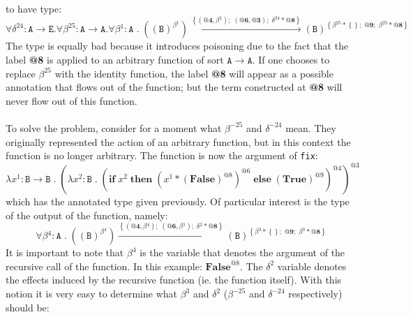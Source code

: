 \documentclass[8pt]{extarticle}
\begin{document}
to have type:
\[
\forall{}\delta^{24}:\mathtt{A}\to\mathtt{E}.\forall{}\beta^{25}:\mathtt{A}\to\mathtt{A}.\forall{}\beta{}^{1}:\mathtt{A}\;{}.\;{}\left(\left(\mathtt{B}\right)^{\beta{}^{1}}\right)\xrightarrow{\left\{\left(\textbf{@4},\beta{}^{1}\right);\;{}\left(\textbf{@6},\textbf{@3}\right);\;{}\delta{}^{24}*\textbf{@8}\right\}}\left(\mathtt{B}\right)^{\left\{\beta{}^{25}*\left\{\right\};\;{}\textbf{@9};\;{}\beta{}^{25}*\textbf{@8}\right\}}
\]
The type is equally bad because it introduces poisoning due to the fact that the label {\bf @8} is applied to an arbitrary function of sort $\mathtt{A}\to\mathtt{A}$. If one chooses to replace $\beta^{25}$ with the identity function, the label {\bf @8} will appear as a possible annotation that flows out of the function; but the term constructed at {\bf @8} will never flow out of this function.
\\\\
To solve the problem, consider for a moment what $\beta^{-25}$ and $\delta^{-24}$ mean. They originally represented the action of an arbitrary function, but in this context the function is no longer arbitrary. The function is now the argument of \verb+fix+:
\[
\lambda{}x^{1}:\mathtt{B}\to{}\mathtt{B}\;{}.\;{}\left(\lambda{}x^{2}:\mathtt{B}\;{}.\;{}\left(\mathbf{if}\;{}x^{2}\;{}\mathbf{then}\;{}\left(x^{1}*\left(\mathbf{False}\right)^{\mathit{@8}}\right)^{\mathit{@6}}\;{}\mathbf{else}\;{}\left(\mathbf{True}\right)^{\mathit{@9}}\right)^{\mathit{@4}}\right)^{\mathit{@3}}
\]
which has the annotated type given previously. Of particular interest is the type of the output of the function, namely:
\[
\forall{}\beta{}^{4}:\mathtt{A}\;{}.\;{}\left(\left(\mathtt{B}\right)^{\beta{}^{4}}\right)\xrightarrow{\left\{\left(\textbf{@4},\beta{}^{4}\right);\;{}\left(\textbf{@6},\beta{}^{1}\right);\;{}\delta{}^{2}*\textbf{@8}\right\}}\left(\mathtt{B}\right)^{\left\{\beta{}^{3}*\left\{\right\};\;{}\textbf{@9};\;{}\beta{}^{3}*\textbf{@8}\right\}}
\]
It is important to note that $\beta^{4}$ is the variable that denotes the argument of the recursive call of the function. In this example: $\mathbf{False}^{\mathit{@8}}$. The $\delta^2$ variable denotes the effects induced by the recursive function (ie. the function itself). With this notion it is very easy to determine what $\beta^{3}$ and $\delta^{2}$ ($\beta^{-25}$ and $\delta^{-24}$ respectively) should be:
\end{document}
